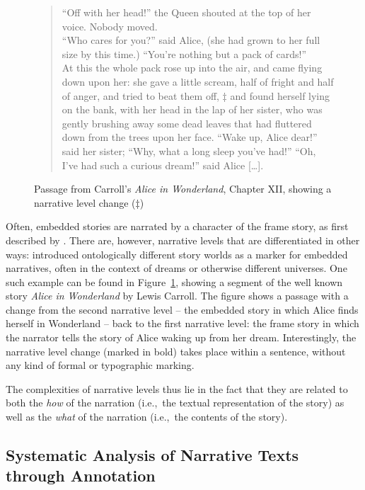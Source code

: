 \documentclass[10pt, a4paper]{article}
\begin{document}
\begin{figure}
\begin{quote}
\enquote{Off with her head!} the Queen shouted at the top of her voice. Nobody moved.\\
\enquote{Who cares for you?} said Alice, (she had grown to her full size by this time.) \enquote{You're nothing but a pack of cards!}\\
At this the whole pack rose up into the air, and came flying down upon her: she gave a little scream, half of fright and half of anger, and tried to beat them off, $\ddagger$ and found herself lying on the bank, with her head in the lap of her sister, who was gently brushing away some dead leaves that had fluttered down from the trees upon her face.
\enquote{Wake up, Alice dear!} said her sister; \enquote{Why, what a long sleep you've had!}
\enquote{Oh, I've had such a curious dream!} said Alice [\dots].
\end{quote}
\caption{Passage from Carroll's \textit{Alice in Wonderland}, Chapter XII, showing a narrative level change ($\ddagger$)}
\label{fig:alice}
\end{figure}

Often, embedded stories are narrated by a character of the frame story, as first described by \cite{Genette:1980aa}. There are, however, narrative levels that are differentiated in other ways: \cite{ryan_1991} introduced ontologically different story worlds as a marker for embedded narratives,  often in the context of dreams or otherwise different universes. One such example can be found in Figure~\ref{fig:alice}, showing a segment of the well known story \textit{Alice in Wonderland} by Lewis Carroll. The figure shows a passage with a change from the second narrative level -- the embedded story in which Alice finds herself in Wonderland -- back to the first narrative level: the frame story in which the narrator tells the story of Alice waking up from her dream. Interestingly, the narrative level change (marked in bold) takes place within a sentence, without any kind of formal or typographic marking.

The complexities of narrative levels thus lie in the fact that they are related to both the \textit{how} of the narration (i.e.,~the textual representation of the story) as well as the \textit{what} of the narration (i.e.,~the contents of the story).

\subsection{Systematic Analysis of Narrative Texts through Annotation}
\end{document}
